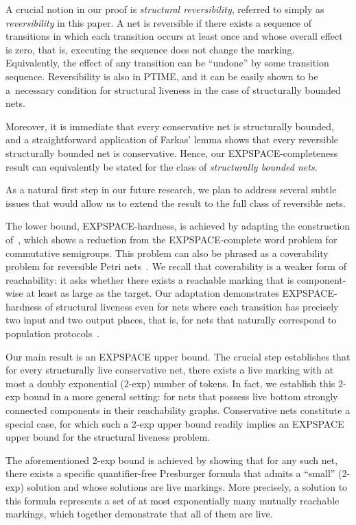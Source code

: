 \documentclass[11pt,a4paper]{amsart}
\theoremstyle{plain}
\theoremstyle{definition}
\theoremstyle{defC}
\theoremstyle{thmC}
\begin{document}
A crucial notion in our proof is \emph{structural reversibility},
referred to simply as \emph{reversibility} in this paper. 
A net is reversible if there exists a sequence of transitions in which
each transition occurs at least once and whose overall effect is zero,
that is, executing the sequence does not change the marking.
Equivalently, the effect of any transition can be ``undone'' by some transition sequence.
Reversibility is also in PTIME, and it can be easily shown to be a~necessary condition for structural liveness in the case of structurally bounded nets.

Moreover, it is immediate that every conservative net is structurally bounded, and a straightforward application of Farkas’ lemma shows that every reversible structurally bounded net is conservative. Hence, our EXPSPACE-completeness result can equivalently be stated for the class of \emph{structurally bounded nets}.

As a natural first step in our future research, we plan to address several subtle issues that would allow us to extend the result to the full class of reversible nets.

The lower bound, EXPSPACE-hardness, is achieved by adapting the
construction of~\cite{DBLP:journals/acta/JancarP19}, which shows a
reduction from the EXPSPACE-complete word problem for commutative
semigroups. This problem can also be phrased as a coverability problem
for reversible Petri nets~\cite{DBLP:conf/stoc/CardozaLM76,
mayr1982complexity, DBLP:journals/jc/Mayr97}. We recall that
coverability is a weaker form of reachability: it asks whether there
exists a reachable marking that is component-wise at least as large as the target. Our adaptation demonstrates EXPSPACE-hardness of structural liveness even for nets where each transition has precisely two input and 
two output places, that is, for nets that naturally correspond to population protocols~\cite{DBLP:journals/dc/AngluinADFP06}.


Our main result is an EXPSPACE upper bound. The crucial step
establishes
that for every structurally live conservative net, there exists a live
marking with at most a doubly exponential (2-exp) number of tokens.
In fact, we establish this 2-exp bound in a more general setting: for nets
that possess live bottom strongly connected components in their
reachability graphs. Conservative nets constitute a
special case, for which such a 2-exp upper bound readily implies an
EXPSPACE upper bound for the structural liveness problem.

The aforementioned 2-exp bound is achieved by showing that for any
such net, there exists a specific quantifier-free
Presburger formula that admits a ``small'' (2-exp) solution and whose
solutions are live markings. More precisely, a solution to this
formula represents a set of at most exponentially many mutually
reachable markings, which together demonstrate that all of them are live.
\end{document}
